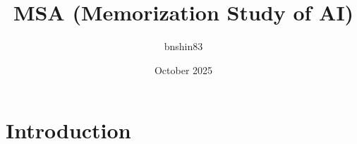 \documentclass{article}
\title{MSA (Memorization Study of AI)}
\author{bnshin83 }
\date{October 2025}
\begin{document}
\maketitle

\section{Introduction}
\end{document}
